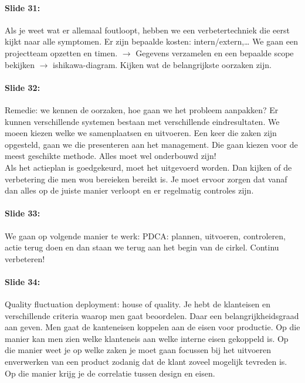 \documentclass[10pt,a4paper]{report}
\begin{document}
\paragraph{Slide 31:} Als je weet wat er allemaal foutloopt, hebben we een verbetertechniek die eerst kijkt naar alle symptomen. Er zijn bepaalde kosten: intern/extern,… We gaan een projectteam opzetten en timen. $\rightarrow$ Gegevens verzamelen en een bepaalde scope bekijken $\rightarrow$ ishikawa-diagram. Kijken wat de belangrijkste oorzaken zijn. 

\paragraph{Slide 32:} Remedie: we kennen de oorzaken, hoe gaan we het probleem aanpakken? Er kunnen verschillende systemen bestaan met verschillende eindresultaten. We moeen kiezen welke we samenplaatsen en uitvoeren. Een keer die zaken zijn opgesteld, gaan we die presenteren aan het management. Die gaan kiezen voor de meest geschikte methode. Alles moet wel onderbouwd zijn!\\
Als het actieplan is goedgekeurd, moet het uitgevoerd worden. Dan kijken of de verbetering die men wou bereieken bereikt is. Je moet ervoor zorgen dat vanaf dan alles op de juiste manier verloopt en er regelmatig controles zijn.

\paragraph{Slide 33:} We gaan op volgende manier te werk: PDCA: plannen, uitvoeren, controleren, actie terug doen en dan staan we terug aan het begin van de cirkel. Continu verbeteren!

\paragraph{Slide 34:} Quality fluctuation deployment: house of quality. Je hebt de klanteisen en verschillende criteria waarop men gaat beoordelen. Daar een belangrijkheidsgraad aan geven. Men gaat de kanteneisen koppelen aan de eisen voor productie. Op die manier kan men zien welke klanteneis aan welke interne eisen gekoppeld is. Op die manier weet je op welke zaken je moet gaan focussen bij het uitvoeren enverwerken van een product zodanig dat de klant zoveel mogelijk tevreden is. Op die manier krijg je de correlatie tussen design en eisen.
\end{document}
